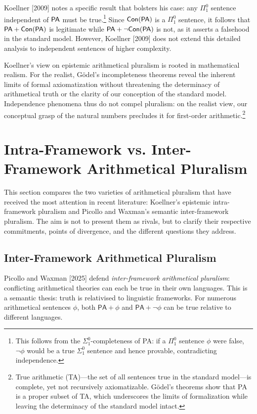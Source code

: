 \documentclass[a4paper,12pt]{amsart}
\theoremstyle{definition}
\numberwithin{equation}{section}
\begin{document}
Koellner [2009] notes a specific result that bolsters his case: any $\Pi^0_1$ sentence independent of $\sf PA$ must be true.\footnote{This follows from the $\Sigma^0_1$-completeness of {\sf PA}: if a $\Pi^0_1$ sentence $\phi$ were false, $\neg\phi$  would be a true $\Sigma^0_1$ sentence and hence provable, contradicting independence.} Since ${\sf Con(PA)}$ is a $\Pi^0_1$ sentence, it follows that ${\sf PA}+\sf Con(PA)$ is legitimate while ${\sf PA}+\neg \sf Con(PA)$ is not, as it asserts a falsehood in the standard model. However, Koellner [2009] does not extend this detailed analysis to independent sentences of higher complexity.
 
Koellner's view on epistemic arithmetical pluralism is rooted in mathematical realism. For the realist, Gödel's incompleteness theorems reveal the inherent limits of formal axiomatization without threatening the determinacy of arithmetical truth or the clarity of our conception of the standard model. Independence phenomena thus do not compel pluralism: on the realist view, our conceptual grasp of the natural numbers precludes it for first-order arithmetic.\footnote{True arithmetic ({\sf TA})—the set of all sentences true in the standard model—is complete, yet not recursively axiomatizable. Gödel's theorems show that {\sf PA}  is a proper subset of {\sf TA}, which underscores the limits of formalization while leaving the determinacy of the standard model intact.} 

\section{Intra-Framework vs. Inter-Framework Arithmetical Pluralism}\label{section4}

This section compares the two varieties of arithmetical pluralism that 
have received the most attention in recent literature: Koellner's 
epistemic intra-framework pluralism and Picollo and Waxman's semantic 
inter-framework pluralism. The aim is not to present them as rivals, 
but to clarify their respective commitments, points of divergence, and 
the different questions they address.
  
\subsection{Inter-Framework Arithmetical Pluralism}\label{P-W analysis}

Picollo and Waxman [2025] defend \emph{inter-framework arithmetical pluralism}: conflicting arithmetical theories can each be true in their own languages. This is a semantic thesis: truth is relativised to linguistic frameworks. For numerous arithmetical sentences $\phi$, both $\mathsf{PA}+\phi$ and $\mathsf{PA}+\neg\phi$ can be true relative to 
different languages.
\end{document}
